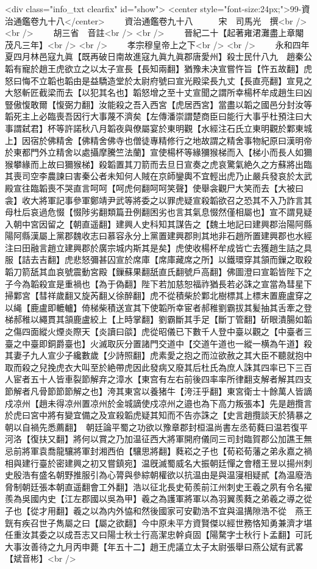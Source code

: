 <div class="info_txt clearfix" id="show">
<center style="font-size:24px;">99-資治通鑑卷九十八</center>
  　　資治通鑑卷九十八　　　宋　司馬光　撰<br />
<br />
　　胡三省　音註<br />
<br />
　　晉紀二十【起著雍涒灘盡上章閹茂凡三年】<br />
<br />
　　孝宗穆皇帝上之下<br />
<br />
　　永和四年夏四月林邑寇九眞【既再破日南故進寇九眞九眞郡唐愛州】殺士民什八九　趙秦公韜有寵於趙王虎欲立之以太子宣長【長知兩翻】猶豫未决宣嘗忤旨【忤五故翻】虎怒曰悔不立韜也韜由是益驕造堂於太尉府號曰宣光殿梁長九丈【長直亮翻】宣見之大怒斬匠截梁而去【以犯其名也】韜怒增之至十丈宣聞之謂所幸楊杯牟成趙生曰凶豎傲愎敢爾【愎弼力翻】汝能殺之吾入西宮【虎居西宮】當盡以韜之國邑分封汝等韜死主上必臨喪吾因行大事蔑不濟矣【左傳潘崇謂楚商臣曰能行大事乎杜預注曰大事謂弑君】杯等許諾秋八月韜夜與僚屬宴於東明觀【水經注石氏立東明觀於鄴東城上】因宿於佛精舍【佛精舍佛寺也僧徒專精修行之地故謂之精舍事物紀原曰漢明帝於東都門外立精舍以處攝摩騰竺法蘭】宣使楊杯等緣獼猴梯而入【梯小而長人如獮猴攀緣而上故曰獮猴梯】殺韜置其刀箭而去旦日宣奏之虎哀驚氣絶久之方蘇將出臨其喪司空李農諫曰害秦公者未知何人賊在京師鑾輿不宜輕出虎乃止嚴兵發哀於太武殿宣往臨韜喪不哭直言呵呵【呵虎何翻呵呵笑聲】使舉衾觀尸大笑而去【大被曰衾】收大將軍記事參軍鄭靖尹武等將委之以罪虎疑宣殺韜欲召之恐其不入乃詐言其母杜后哀過危惙【惙陟劣翻類篇丑例翻困劣也言其氣息惙然僅相屬也】宣不謂見疑入朝中宮因留之【朝直遥翻】建興人史科知其謀告之【魏土地記曰建興郡治陽阿縣陽阿縣漢屬上黨郡魏收志曰慕容永分上黨置建興郡則其地非石趙所置建興郡也水經注曰田融言趙立建興郡於廣宗城内斯其是矣】虎使收楊杯牟成皆亡去獲趙生詰之具服【詰去吉翻】虎悲怒彌甚囚宣於席庫【席庫藏席之所】以鐵環穿其頷而鏁之取殺韜刀箭舐其血哀號震動宮殿【鏁蘇果翻舐直氏翻號戶高翻】佛圖澄曰宣韜皆陛下之子今為韜殺宣是重禍也【為于偽翻】陛下若加慈恕福祚猶長若必誅之宣當為彗星下掃鄴宮【彗祥歲翻又旋芮翻乂徐醉翻】虎不從積柴於鄴北樹標其上標末置鹿盧穿之以䋲【鹿盧即轆轤】倚梯柴積送宣其下使韜所幸宦者郝稚劉霸拔其髪抽其舌牽之登梯郝稚以繩貫其頷鹿盧絞上【上時掌翻】劉霸斷其手足【斷丁管翻】斫眼潰腸如韜之傷四面縱火煙炎際天【炎讀曰燄】虎從昭儀已下數千人登中臺以觀之【中臺者三臺之中臺即銅爵臺也】火滅取灰分置諸門交道中【交道午道也一縱一横為午道】殺其妻子九人宣少子纔數歲【少詩照翻】虎素愛之抱之而泣欲赦之其大臣不聽就抱中取而殺之兒挽虎衣大叫至於絶帶虎因此發病又廢其后杜氏為庶人誅其四率已下三百人宦者五十人皆車裂節解弃之漳水【東宫有左右前後四率率所律翻支解者解其四支節解者凡骨節節節解之也】洿其東宮以養猪牛【洿汪乎翻】東宮衛士十餘萬人皆謫戍凉州【趙未得凉州置凉州於金城謫使戍凉州之邉也為下高力叛張本】先是趙攬言於虎曰宮中將有變宜備之及宣殺韜虎疑其知而不告亦誅之【史言趙攬談天於猜暴之朝以自禍先悉薦翻】　朝廷論平蜀之功欲以豫章郡封桓温尚書左丞荀蕤曰温若復平河洛【復扶又翻】將何以賞之乃加温征西大將軍開府儀同三司封臨賀郡公加譙王無忌前將軍袁喬龍驤將軍封湘西伯【驤思將翻】蕤崧之子也【荀崧荀藩之弟永嘉之禍相與建行臺於密建興之初又嘗鎮宛】温旣滅蜀威名大振朝廷憚之會稽王昱以揚州刺史殷浩有盛名朝野推服引為心膂與參綜朝權欲以抗温由是與温寖相疑貳【為温廢浩脅制朝廷張本朝直遥翻會工外翻】浩以征北長史荀羨前江州刺史王羲之夙有令名擢羨為吳國内史【江左郡國以吳為甲】羲之為護軍將軍以為羽翼羨蕤之弟羲之導之從子也【從才用翻】羲之以為内外恊和然後國家可安勸浩不宜與温搆隙浩不從　燕王皝有疾召世子雋屬之曰【屬之欲翻】今中原未平方資賢傑以經世務恪知勇兼濟才堪任重汝其委之以成吾志又曰陽士秋士行高潔忠幹貞固【陽騖字士秋行卜孟翻】可託大事汝善待之九月丙申薨【年五十二】趙王虎議立太子太尉張舉曰燕公斌有武畧【斌音彬】<br />

